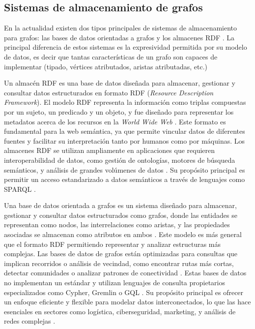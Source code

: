 \subsection{Sistemas de almacenamiento de grafos}

En la actualidad existen dos tipos principales de sistemas de almacenamiento para grafos:
las bases de datos orientadas a grafos y los almacenes RDF \cite{angles2008survey}. 
La principal diferencia de estos
sistemas es la expresividad permitida por su modelo de datos, es decir que tantas características
de un grafo son capaces de implementar (tipado, vértices atributados, aristas atributadas, etc.)

Un almacén RDF es una base de datos diseñada para almacenar, gestionar y consultar datos estructurados en formato RDF (\textit{Resource Description Framework}). 
El modelo RDF representa la información como triplas compuestas por un sujeto, un predicado y un objeto, y fue diseñado para representar los metadatos acerca de los recursos en la \textit{World Wide Web} \cite{manola2004rdf}.
Este formato es fundamental para la web semántica, ya que permite vincular datos de diferentes fuentes y facilitar su interpretación tanto por humanos como por máquinas. Los almacenes RDF se utilizan ampliamente en aplicaciones que requieren interoperabilidad de datos, como gestión de ontologías, motores de búsqueda semánticos, y análisis de grandes volúmenes de datos \cites*{haase2004comparison,decker2005triple,malik2016big}. 
Su propósito principal es permitir un acceso estandarizado a datos semánticos a través de lenguajes como SPARQL \cite{perez2006semantics}.

Una base de datos orientada a grafos es un sistema diseñado para almacenar, gestionar y consultar datos estructurados como grafos, donde las entidades se representan como nodos, las interrelaciones como aristas, y las propiedades asociadas se almacenan como atributos en ambos \cite{angles2008survey}. 
Este modelo es más general que el formato RDF permitiendo representar y analizar estructuras más complejas. 
Las bases de datos de grafos están optimizadas para consultas que implican recorridos o análisis de vecindad, como encontrar rutas más cortas, detectar comunidades o analizar patrones de conectividad \cite{neo4jgraph}. 
Estas bases de datos no implementan un estándar y utilizan lenguajes de consulta propietarios especializados como Cypher, Gremlin o GQL \cite{neo4jcypher}. 
Su propósito principal es ofrecer un enfoque eficiente y flexible para modelar datos interconectados, lo que las hace esenciales en sectores como logística, ciberseguridad, marketing, y análisis de redes complejas \cite{neo4jgraphuses}.


